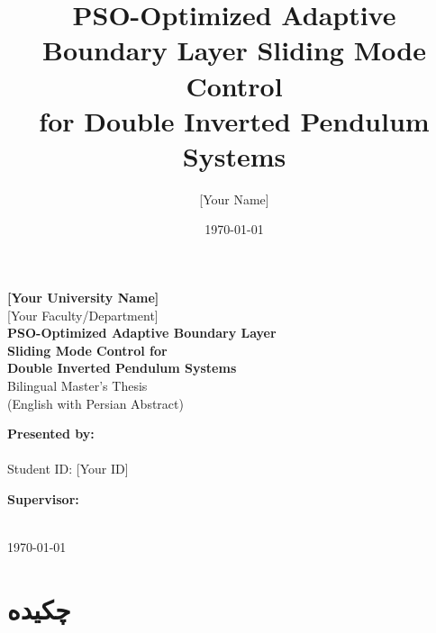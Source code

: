 \documentclass[12pt,a4paper,oneside]{report}
\title{PSO-Optimized Adaptive Boundary Layer Sliding Mode Control \\
for Double Inverted Pendulum Systems}
\author{[Your Name]}
\date{\today}
\begin{document}

\begin{titlepage}
\centering
\vspace*{1cm}

{\LARGE \textbf{[Your University Name]}}\\[0.5cm]
{\large [Your Faculty/Department]}\\[2cm]

{\Huge \textbf{PSO-Optimized Adaptive Boundary Layer \\ Sliding Mode Control for \\ Double Inverted Pendulum Systems}}\\[1.5cm]

{\Large Bilingual Master's Thesis}\\[0.5cm]
{\large (English with Persian Abstract)}\\[3cm]

\begin{minipage}{0.4\textwidth}
\begin{flushleft}
\textbf{Presented by:}\\
[Your Full Name]\\
Student ID: [Your ID]
\end{flushleft}
\end{minipage}
\begin{minipage}{0.4\textwidth}
\begin{flushright}
\textbf{Supervisor:}\\
[Supervisor Name]\\
[Supervisor Title]
\end{flushright}
\end{minipage}

\vfill

{\large \today}

\end{titlepage}

\chapter*{چکیده}
\end{document}
